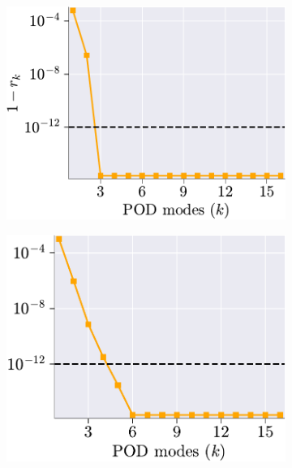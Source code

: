 \documentclass[11pt]{article}
\begin{document}
    \begin{figure}[t]
        \centering
        \begin{subfigure}[b]{0.45\linewidth}
            \centering
            \includegraphics[width=\linewidth]{linear_Mode_selection.pdf}
            \caption{}
            \label{fig:HC_ROM_a}
        \end{subfigure}
        \begin{subfigure}[b]{0.45\linewidth}
            \centering
            \includegraphics[width=0.93\linewidth]{nonlinear_Mode_selection.pdf}
            \caption{}
            \label{fig:HC_ROM_b}
        \end{subfigure}


\end{figure}
\end{document}
